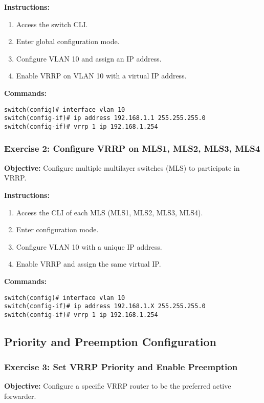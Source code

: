 \documentclass[12pt]{article}
\begin{document}
\textbf{Instructions:}
\begin{enumerate}
\item Access the switch CLI.
\item Enter global configuration mode.
\item Configure VLAN 10 and assign an IP address.
\item Enable VRRP on VLAN 10 with a virtual IP address.
\end{enumerate}

\textbf{Commands:}
\begin{lstlisting}[style=CiscoCLI]
switch(config)# interface vlan 10
switch(config-if)# ip address 192.168.1.1 255.255.255.0
switch(config-if)# vrrp 1 ip 192.168.1.254
\end{lstlisting}

\bigskip

\subsubsection*{Exercise 2: Configure VRRP on MLS1, MLS2, MLS3, MLS4}
\textbf{Objective:} Configure multiple multilayer switches (MLS) to participate in VRRP.

\textbf{Instructions:}
\begin{enumerate}
\item Access the CLI of each MLS (MLS1, MLS2, MLS3, MLS4).
\item Enter configuration mode.
\item Configure VLAN 10 with a unique IP address.
\item Enable VRRP and assign the same virtual IP.
\end{enumerate}

\textbf{Commands:}
\begin{lstlisting}[style=CiscoCLI]
switch(config)# interface vlan 10
switch(config-if)# ip address 192.168.1.X 255.255.255.0
switch(config-if)# vrrp 1 ip 192.168.1.254
\end{lstlisting}

\bigskip

\subsection{Priority and Preemption Configuration}

\subsubsection*{Exercise 3: Set VRRP Priority and Enable Preemption}
\textbf{Objective:} Configure a specific VRRP router to be the preferred active forwarder.
\end{document}
